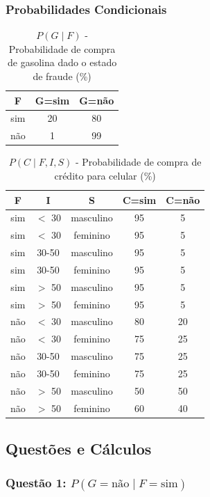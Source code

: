\documentclass[a4paper,12pt]{article}
\begin{document}
\subsubsection{Probabilidades Condicionais}

\clearpage
\begin{table}[H]
\centering
\begin{tabular}{|c|c|c|}
\hline
\textbf{F} & \textbf{G=sim} & \textbf{G=não} \\
\hline
sim & 20 & 80 \\
não & 1 & 99 \\
\hline
\end{tabular}
\caption{$P(G \mid F)$ - Probabilidade de compra de gasolina dado o estado de fraude (\%)}
\end{table}

\begin{table}[H]
\centering
\small
\begin{tabular}{|c|c|c|c|c|}
\hline
\textbf{F} & \textbf{I} & \textbf{S} & \textbf{C=sim} & \textbf{C=não} \\
\hline
sim & $<$ 30 & masculino & 95 & 5 \\
sim & $<$ 30 & feminino & 95 & 5 \\
sim & 30-50 & masculino & 95 & 5 \\
sim & 30-50 & feminino & 95 & 5 \\
sim & $>$ 50 & masculino & 95 & 5 \\
sim & $>$ 50 & feminino & 95 & 5 \\
\hline
não & $<$ 30 & masculino & 80 & 20 \\
não & $<$ 30 & feminino & 75 & 25 \\
não & 30-50 & masculino & 75 & 25 \\
não & 30-50 & feminino & 75 & 25 \\
não & $>$ 50 & masculino & 50 & 50 \\
não & $>$ 50 & feminino & 60 & 40 \\
\hline
\end{tabular}
\caption{$P(C \mid F, I, S)$ - Probabilidade de compra de crédito para celular (\%)}
\end{table}

\subsection{Questões e Cálculos}

\subsubsection{Questão 1: \texorpdfstring{$P(G=\text{não} \mid F=\text{sim})$}{P(G=não | F=sim)}}
\end{document}
